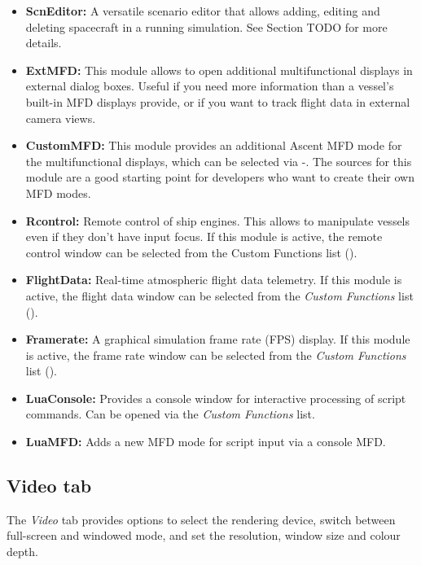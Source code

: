 \documentclass[Orbiter User Manual.tex]{subfiles}
\begin{document}
\begin{itemize}
\item \textbf{ScnEditor:} A versatile scenario editor that allows adding, editing and deleting spacecraft in a running simulation. See Section TODO for more details.
\item \textbf{ExtMFD:} This module allows to open additional multifunctional displays in external dialog boxes. Useful if you need more information than a vessel’s built-in MFD displays provide, or if you want to track flight data in external camera views.
\item \textbf{CustomMFD:} This module provides an additional Ascent MFD mode for the multifunctional displays, which can be selected via \Shift{}-\Shift{}. The sources for this module are a good starting point for developers who want to create their own MFD modes.
\item \textbf{Rcontrol:} Remote control of ship engines. This allows to manipulate vessels even if they don’t have input focus. If this module is active, the remote control window can be selected from the Custom Functions list (\Ctrl{}).
\item \textbf{FlightData:} Real-time atmospheric flight data telemetry. If this module is active, the flight data window can be selected from the \textit{Custom Functions} list (\Ctrl{}).
\item \textbf{Framerate:} A graphical simulation frame rate (FPS) display. If this module is active, the frame rate window can be selected from the \textit{Custom Functions} list (\Ctrl{}).
\item \textbf{LuaConsole:} Provides a console window for interactive processing of script commands. Can be opened via the \textit{Custom Functions} list.
\item \textbf{LuaMFD:} Adds a new MFD mode for script input via a console MFD.
\end{itemize}


\subsection{Video tab}
The \textit{Video} tab provides options to select the rendering device, switch between full-screen and windowed mode, and set the resolution, window size and colour depth.

\begin{figure}[H]
	\centering
\end{figure}
\end{document}
